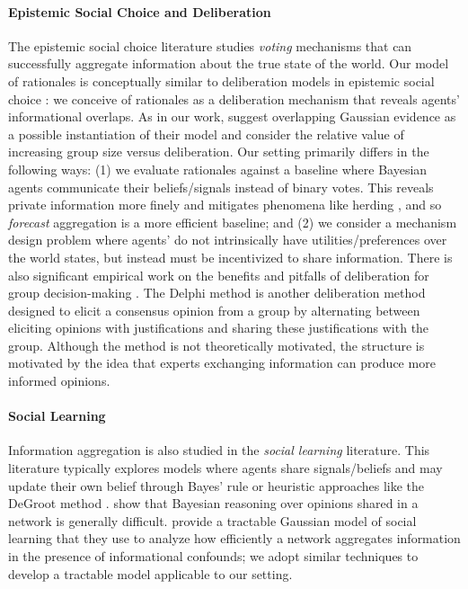 \documentclass{winnower}
\begin{document}
\paragraph{Epistemic Social Choice and Deliberation} The epistemic social choice literature studies \emph{voting} mechanisms that can successfully aggregate information about the true state of the world.  
Our model of rationales is conceptually similar to deliberation models in epistemic social choice \citep{dietrich2024deliberation, ding2021deliberation}\@: we conceive of rationales as a deliberation mechanism that reveals agents' informational overlaps. As in our work, \citet{dietrich2024deliberation} suggest overlapping Gaussian evidence as a possible instantiation of their model and consider the relative value of increasing group size versus deliberation. Our setting primarily differs in the following ways: (1) we evaluate rationales against a baseline where Bayesian agents communicate their beliefs/signals instead of binary votes. This reveals private information more finely and mitigates phenomena like herding \citep{banerjee1992simple, bikhchandani1998learning}, and so \emph{forecast} aggregation is a more efficient baseline; and (2) we consider a mechanism design problem where agents' do not intrinsically have utilities/preferences over the world states, but instead must be incentivized to share information. There is also significant empirical work on the benefits and pitfalls of deliberation for group decision-making \citep{navajas2018aggregated, graeber2024explanations, lorenz2011social, moshman1998collaborative}. The Delphi method \citep{dalkey1963experimental, helmer1967analysis} is another deliberation method designed to elicit a consensus opinion from a group by alternating between eliciting opinions with justifications and sharing these justifications with the group. Although the method is not theoretically motivated, the structure is motivated by the idea that experts exchanging information can produce more informed opinions. 

\paragraph{Social Learning}  Information aggregation is also studied in the \emph{social learning} \citep{golub2017learning} literature. This literature typically explores models where agents share signals/beliefs and may update their own belief through Bayes' rule \citep{acemoglu2011bayesian} or heuristic approaches like the DeGroot method \citep{degroot1974reaching}. \citet{hkazla2021bayesian} show that Bayesian reasoning over opinions shared in a network is generally difficult. \citet{dasaratha2019aggregative} provide a tractable Gaussian model of social learning that they use to analyze how efficiently a network aggregates information in the presence of informational confounds; we adopt similar techniques to develop a tractable model applicable to our setting.
\end{document}
